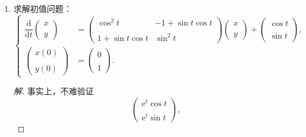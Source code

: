 \begin{enumerate}
\begin{proof}[解]
（2）当 $\lambda=0$ 时，方程的通解可写为：
\[x(t)=C_{1}+C_{2}t, \quad C_{1}, C_{2} \in \mathbb{R}.\]
此种情况为满足边界条件也只能有 $C_{1}=C_{2}=0$，无非平凡解；

（3）当 $\lambda>0$ 时，方程的通解可写为：
\[x(t)=C_{1}\cos\sqrt{\lambda}t+C_{2}\sin\sqrt{\lambda}t, \quad C_{1}, C_{2} \in \mathbb{R}.\]
由 $x(0)=0$ 知 $C_{1}=0$，再由 $x(l)=C_{2} \sin \sqrt{\lambda} l=0$ 可知，
为了使 $C_{2} \neq 0$，我们必须有：$\lambda=\lambda_{k}=\dfrac{k^{2}\pi^{2}}{l^{2}}$ $(k=1,2, \ldots)$。

综上所述，$\lambda$ 的取值为：$\dfrac{\pi^{2}}{l^{2}}, \dfrac{4\pi^{2}}{l^{2}}, \dfrac{9\pi^{2}}{l^{2}}, \cdots, \dfrac{k^{2}\pi^{2}}{l^{2}}, \cdots$。
\end{proof}
\item 求解初值问题：
\[\begin{cases}
\dfrac{\mathrm{d}}{\mathrm{d} t}\begin{pmatrix}x \\ \\ y\end{pmatrix} 
& =\begin{pmatrix}
\cos^{2} t & -1+\sin t \cos t \\ \\ 
1+\sin t \cos t & \sin^{2} t
\end{pmatrix}\begin{pmatrix}x \\ \\ y\end{pmatrix}
+\begin{pmatrix}\cos t \\ \\ \sin t\end{pmatrix}, \\
\begin{pmatrix}x(0) \\ \\ y(0)\end{pmatrix} & 
=\begin{pmatrix}0 \\ \\ 1\end{pmatrix}.
\end{cases}\]
\begin{proof}[解]
事实上，不难验证
\[\begin{pmatrix}\mathrm{e}^{t} \cos t \\ \\ \mathrm{e}^{t} \sin t\end{pmatrix}, 
\]
\end{proof}
\end{enumerate}
